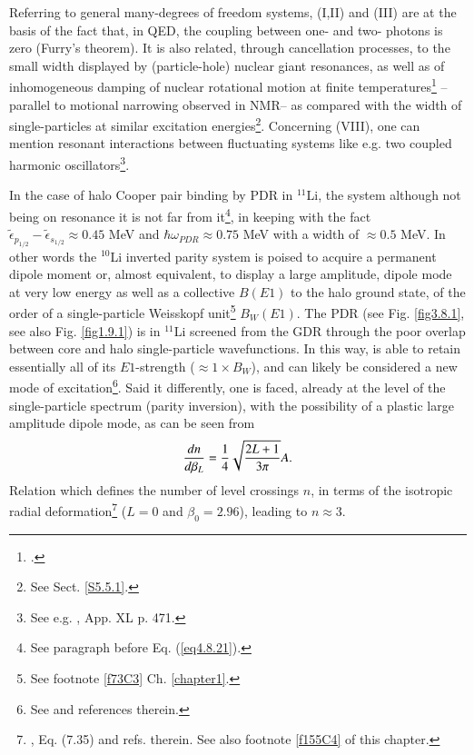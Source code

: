  Referring to general many-degrees of freedom systems, (I,II) and (III) are at the basis of the fact that, in QED, the coupling between one- and two- photons is zero (Furry's theorem). It is also related, through cancellation processes, to the small width displayed by (particle-hole) nuclear giant resonances, as well as of inhomogeneous damping of nuclear  rotational motion at finite temperatures\footnote{\cite{Broglia:87}.} --parallel to motional narrowing observed in NMR--  as compared with the  width of single-particles at  similar excitation energies\footnote{See Sect. \ref{S5.5.1}.}. Concerning (VIII), one can mention resonant interactions between fluctuating systems like e.g. two coupled harmonic oscillators\footnote{See e.g. \cite{Born:69}, App. XL p. 471.}. 




In the case of halo Cooper pair binding by PDR in $^{11}$Li, the system although not being on resonance it is not far from it\footnote{See paragraph before Eq. (\ref{eq4.8.21}).}, in keeping with the fact $\widetilde\epsilon_{p_{1/2}}-\widetilde\epsilon_{s_{1/2}}\approx 0.45$ MeV and $\hbar\omega_{PDR}\approx0.75$ MeV with a width of $\approx0.5$ MeV. In other words the $^{10}$Li inverted parity system is poised to acquire a permanent dipole moment or, almost equivalent, to display a large amplitude, dipole mode at very low energy as well as a collective $B(E1)$ to the halo ground state, of the order of a single-particle Weisskopf unit\footnote{See footnote \ref{f73C3} Ch. \ref{chapter1}.} $B_{W}(E1)$. The PDR (see Fig. \ref{fig3.8.1}, see also Fig. \ref{fig1.9.1}) is in $^{11}$Li  screened from the GDR through the poor overlap between core and halo single-particle wavefunctions. In this way, is able to retain essentially all of its  $E1$-strength ($\approx1\times B_{W}$), and can likely be considered a new mode of excitation\footnote{See \cite{Broglia:19} and references therein.}. Said it differently, one is faced, already at the level of the single-particle spectrum (parity inversion), with the possibility of a plastic large amplitude dipole mode, as can be seen from  
\begin{align}\label{eq3C6}
\frac{dn}{d\beta_L}=\frac{1}{4}\sqrt{\frac{2L+1}{3\pi}}A. \idx{Dynamical binding}
\end{align}  
Relation which defines the number of level crossings $n$, in terms of the isotropic radial deformation\footnote{\cite{Brink:05}, Eq. (7.35) and refs. therein. See also footnote \ref{f155C4} of this chapter.} 
($L=0$ and $\beta_0=2.96$),  leading to $n\approx 3$.
